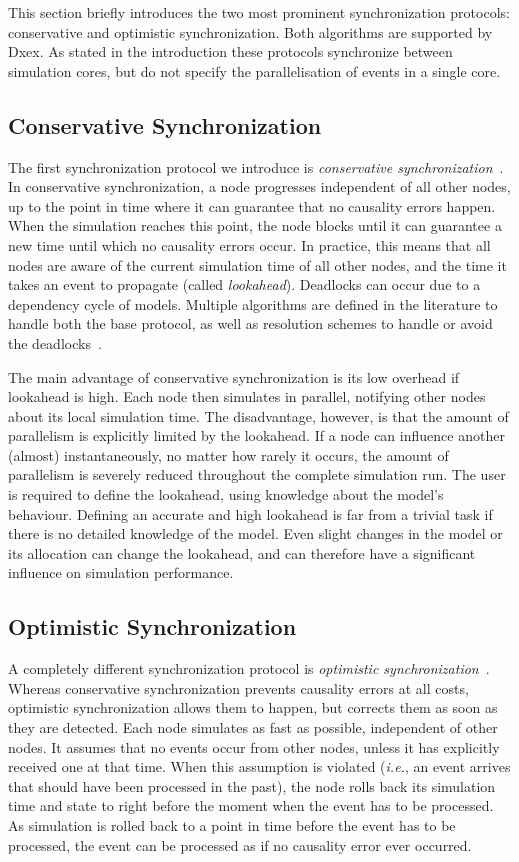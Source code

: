 This section briefly introduces the two most prominent synchronization protocols: conservative and optimistic synchronization.
Both algorithms are supported by Dxex. 
As stated in the introduction these protocols synchronize between simulation cores, but do not specify the parallelisation of events in a single core.

\subsection{Conservative Synchronization}
The first synchronization protocol we introduce is \textit{conservative synchronization}~\cite{FujimotoBook}.
In conservative synchronization, a node progresses independent of all other nodes, up to the point in time where it can guarantee that no causality errors happen.
When the simulation reaches this point, the node blocks until it can guarantee a new time until which no causality errors occur.
In practice, this means that all nodes are aware of the current simulation time of all other nodes, and the time it takes an event to propagate (called \textit{lookahead}).
Deadlocks can occur due to a dependency cycle of models.
Multiple algorithms are defined in the literature to handle both the base protocol, as well as resolution schemes to handle or avoid the deadlocks~\cite{FujimotoBook}.

The main advantage of conservative synchronization is its low overhead if lookahead is high.
Each node then simulates in parallel, notifying other nodes about its local simulation time.
The disadvantage, however, is that the amount of parallelism is explicitly limited by the lookahead.
If a node can influence another (almost) instantaneously, no matter how rarely it occurs, the amount of parallelism is severely reduced throughout the complete simulation run.
The user is required to define the lookahead, using knowledge about the model's behaviour.
Defining an accurate and high lookahead is far from a trivial task if there is no detailed knowledge of the model.
Even slight changes in the model or its allocation can change the lookahead, and can therefore have a significant influence on simulation performance.

\subsection{Optimistic Synchronization}
A completely different synchronization protocol is \textit{optimistic synchronization}~\cite{TimeWarp}.
Whereas conservative synchronization prevents causality errors at all costs, optimistic synchronization allows them to happen, but corrects them as soon as they are detected.
Each node simulates as fast as possible, independent of other nodes.
It assumes that no events occur from other nodes, unless it has explicitly received one at that time.
When this assumption is violated (\textit{i.e.}, an event arrives that should have been processed in the past), the node rolls back its simulation time and state to right before the moment when the event has to be processed.
As simulation is rolled back to a point in time before the event has to be processed, the event can be processed as if no causality error ever occurred.

